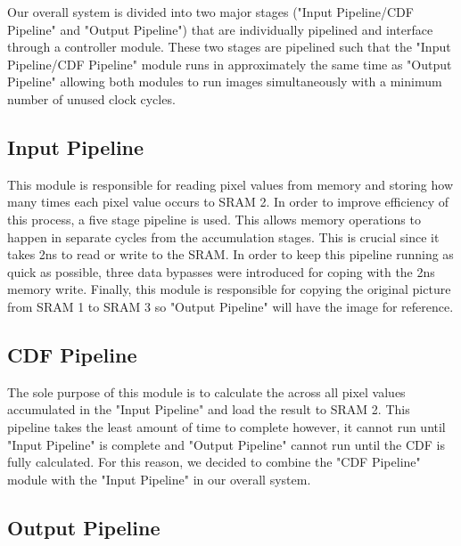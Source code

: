\documentclass[12pt]{IEEEtran}
\begin{document}
\begin{flushleft}
Our overall system is divided into two major stages ("Input Pipeline/CDF Pipeline" and "Output Pipeline") that are individually pipelined and interface through a controller module. These two stages are pipelined such that the "Input Pipeline/CDF Pipeline" module runs in approximately the same time as "Output Pipeline" allowing both modules to run images simultaneously with a minimum number of unused clock cycles.
\end{flushleft}

\subsection*{Input Pipeline}
\begin{flushleft}
This module is responsible for reading pixel values from memory and storing how many times each pixel value occurs to SRAM 2. In order to improve efficiency of this process, a five stage pipeline is used. This allows memory operations to happen in separate cycles from the accumulation stages. This is crucial since it takes 2ns to read or write to the SRAM. In order to keep this pipeline running as quick as possible, three data bypasses were introduced for coping with the 2ns memory write. Finally, this module is responsible for copying the original picture from SRAM 1 to SRAM 3 so "Output Pipeline" will have the image for reference.
\end{flushleft}

\subsection*{CDF Pipeline}
\begin{flushleft}
The sole purpose of this module is to calculate the across all pixel values accumulated in the "Input Pipeline" and load the result to SRAM 2. This pipeline takes the least amount of time to complete however, it cannot run until "Input Pipeline" is complete and "Output Pipeline" cannot run until the CDF is fully calculated. For this reason, we decided to combine the "CDF Pipeline" module with the "Input Pipeline" in our overall system.
\end{flushleft}

\subsection*{Output Pipeline}
\begin{flushleft}

\end{flushleft}
\end{document}
